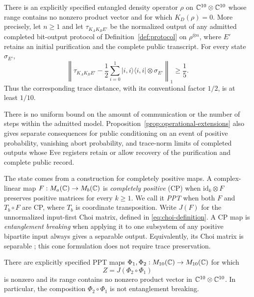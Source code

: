 \begin{theorem}\label{thm:main-state}
There is an explicitly specified entangled density operator $\rho$ on
$\mathbb C^{10}\otimes\mathbb C^{10}$ whose range contains no nonzero product vector and
for which $K_D(\rho)=0$.  More precisely, let $n\geq1$ and let
$\tau_{K_AK_BE'}$ be the normalized output of any admitted completed bit-output protocol of
Definition~\ref{def:protocol} on $\rho^{\otimes n}$, where $E'$ retains an
initial purification and the complete public transcript.  For every state
$\sigma_{E'}$,
\begin{equation}\label{eq:main-gap}
 \left\lVert \tau_{K_AK_BE'}-
 \frac12\sum_{i=0}^1|i,i\rangle\langle i,i|\otimes\sigma_{E'}
 \right\rVert_1\geq\frac15.
\end{equation}
Thus the corresponding trace distance, with its conventional factor
$1/2$, is at least $1/10$.
\end{theorem}

There is no uniform bound on the amount of communication or the number of
steps within the admitted model.  Proposition~\ref{prop:operational-extensions}
also gives separate consequences for public conditioning on an event of
positive probability, vanishing abort probability, and trace-norm limits of
completed outputs whose Eve registers retain or allow recovery of the
purification and complete public record.

The state comes from a construction for completely positive maps.  A
complex-linear map $F:M_{a}(\mathbb C)\to M_{b}(\mathbb C)$ is \emph{completely positive} (CP)
when $\mathrm{id}_k\otimes F$ preserves positive matrices for every
$k\geq1$.  We call it \emph{PPT} when both $F$ and $T_b\circ F$ are CP,
where $T_b$ is coordinate transposition.  Write $J(F)$ for the unnormalized
input-first Choi matrix, defined in \eqref{eq:choi-definition}.  A CP map is
\emph{entanglement breaking} when applying it to one subsystem of any
positive bipartite input always gives a separable output.  Equivalently, its
Choi matrix is separable \cite[Theorem 4]{HSR2003}; this cone formulation
does not require trace preservation.

\begin{theorem}\label{thm:main-pair}
There are explicitly specified PPT maps
$\Phi_1,\Phi_2:M_{10}(\mathbb C)\to M_{10}(\mathbb C)$ for which
\[
 Z=J(\Phi_2\circ\Phi_1)
\]
is nonzero and its range contains no nonzero product vector in
$\mathbb C^{10}\otimes\mathbb C^{10}$.  In particular, the composition
$\Phi_2\circ\Phi_1$ is not entanglement breaking.
\end{theorem}

